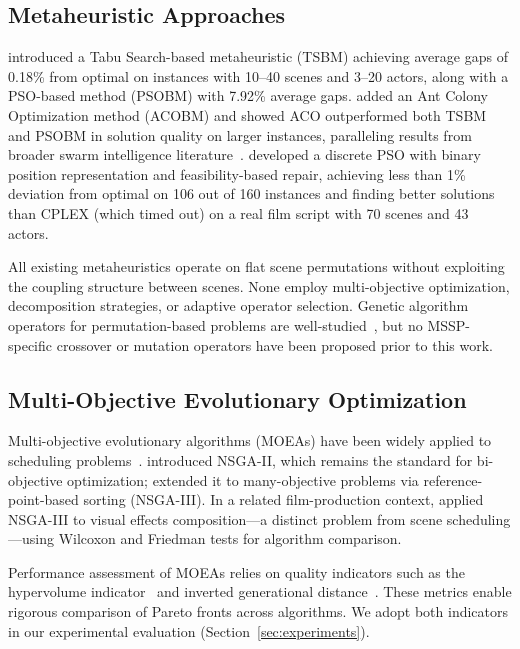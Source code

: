 \subsection{Metaheuristic Approaches}

\citet{liu2019} introduced a Tabu Search-based metaheuristic (TSBM) achieving average gaps of 0.18\% from optimal on instances with 10--40 scenes and 3--20 actors, along with a PSO-based method (PSOBM) with 7.92\% average gaps.
\citet{long2020} added an Ant Colony Optimization method (ACOBM) and showed ACO outperformed both TSBM and PSOBM in solution quality on larger instances, paralleling results from broader swarm intelligence literature~\citep{kennedy1995, clerc2002, dorigo2006}.
\citet{tekin2023} developed a discrete PSO with binary position representation and feasibility-based repair, achieving less than 1\% deviation from optimal on 106 out of 160 instances and finding better solutions than CPLEX (which timed out) on a real film script with 70 scenes and 43 actors.

All existing metaheuristics operate on flat scene permutations without exploiting the coupling structure between scenes.
None employ multi-objective optimization, decomposition strategies, or adaptive operator selection.
Genetic algorithm operators for permutation-based problems are well-studied~\citep{oliver1987, syswerda1991, whitley1994}, but no MSSP-specific crossover or mutation operators have been proposed prior to this work.

\subsection{Multi-Objective Evolutionary Optimization}

Multi-objective evolutionary algorithms (MOEAs) have been widely applied to scheduling problems~\citep{deb2001, coello2007}.
\citet{deb2002} introduced NSGA-II, which remains the standard for bi-objective optimization;
\citet{deb2014} extended it to many-objective problems via reference-point-based sorting (NSGA-III).
In a related film-production context, \citet{han2025} applied NSGA-III to visual effects composition---a distinct problem from scene scheduling---using Wilcoxon and Friedman tests for algorithm comparison.

Performance assessment of MOEAs relies on quality indicators such as the hypervolume indicator~\citep{zitzler2003, ishibuchi2017} and inverted generational distance~\citep{zitzler2000, audet2021}.
These metrics enable rigorous comparison of Pareto fronts across algorithms.
We adopt both indicators in our experimental evaluation (Section~\ref{sec:experiments}).

